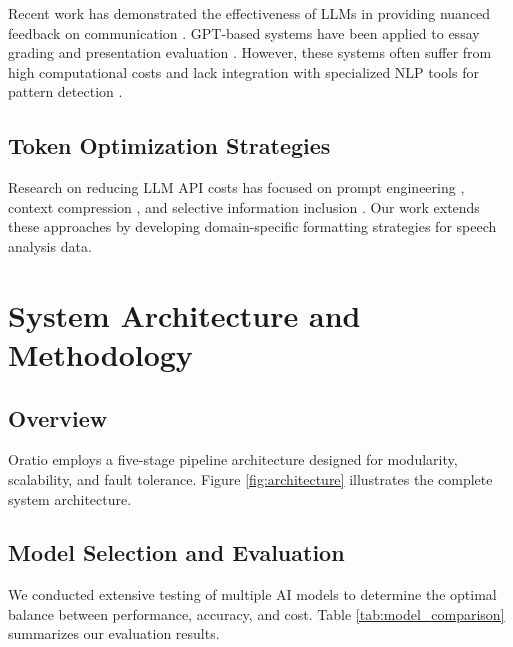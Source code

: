 \documentclass[conference]{IEEEtran}
\begin{document}
Recent work has demonstrated the effectiveness of LLMs in providing nuanced feedback on communication \cite{ouyang2022training}. GPT-based systems have been applied to essay grading \cite{mizumoto2023exploring} and presentation evaluation \cite{nguyen2023evaluating}. However, these systems often suffer from high computational costs and lack integration with specialized NLP tools for pattern detection \cite{zhao2023survey}.

\subsection{Token Optimization Strategies}

Research on reducing LLM API costs has focused on prompt engineering \cite{liu2023pretrain}, context compression \cite{chevalier2023adapting}, and selective information inclusion \cite{jiang2023mistral}. Our work extends these approaches by developing domain-specific formatting strategies for speech analysis data.



\section{System Architecture and Methodology}

\subsection{Overview}

Oratio employs a five-stage pipeline architecture designed for modularity, scalability, and fault tolerance. Figure \ref{fig:architecture} illustrates the complete system architecture.

\subsection{Model Selection and Evaluation}

We conducted extensive testing of multiple AI models to determine the optimal balance between performance, accuracy, and cost. Table \ref{tab:model_comparison} summarizes our evaluation results.
\end{document}
